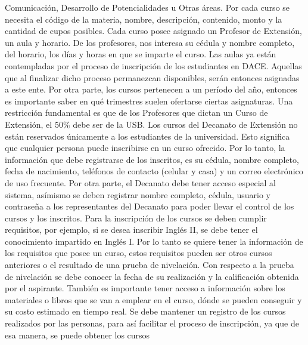 \message{ !name(InformeFase2.tex)}\documentclass[12pt,a4paper,spanish]{article}
\begin{document}
Comunicaci\'on, Desarrollo de Potencialidades u Otras \'areas. Por
cada curso se necesita el c\'odigo de la materia, nombre,
descripci\'on, contenido, monto y la cantidad de cupos posibles. Cada
curso posee asignado un Profesor de Extensi\'on, un aula y horario. De los
profesores, nos interesa su c\'edula y nombre completo, del horario,
los d\'ias y horas en que se imparte el curso. Las aulas ya est\'an
contempladas por el proceso de inscripci\'on de los estudiantes en
DACE. Aquellas que al finalizar dicho proceso permanezcan disponibles,
ser\'an entonces asignadas a este ente. Por otra parte, los cursos
pertenecen a un per\'iodo del a\~no, entonces es importante saber en
qu\'e trimestres suelen ofertarse ciertas asignaturas. Una
restricci\'on fundamental es que de los Profesores que dictan un Curso
de Extensi\'on, el 50\% debe ser de la USB.
\newline
\newline
\indent Los cursos del Decanato de Extensi\'on no est\'an reservados
\'unicamente a los estudiantes de la universidad. Esto significa que
cualquier persona puede inscribirse en un curso ofrecido. Por lo tanto, 
la informaci\'on que debe registrarse de los inscritos, es su
c\'edula, nombre completo, fecha de nacimiento, tel\'efonos de
contacto (celular y casa) y un correo electr\'onico de uso
frecuente. Por otra parte, el Decanato debe tener acceso especial
al sistema, as\'imismo se deben registrar nombre completo, c\'edula, 
usuario y contrase\~na a los representantes del Decanato para poder llevar 
el control de los cursos y los inscritos.
\newline
\newline
\indent Para la inscripci\'on de los cursos se deben cumplir
requisitos, por ejemplo, si se desea inscribir Ingl\'es II, se debe
tener el conocimiento impartido en Ingl\'es I. Por lo tanto se quiere 
tener la informaci\'on de los requisitos que posee un curso, estos
requisitos pueden ser otros cursos anteriores o el resultado de una
prueba de nivelaci\'on. Con respecto a la prueba de nivelaci\'on se debe conocer la fecha
de su realizaci\'on y la calificaci\'on obtenida por el aspirante. Tambi\'en es importante
tener acceso a informaci\'on sobre los materiales o libros que se van a emplear en el curso,
d\'onde se pueden conseguir y su costo estimado en tiempo real. 
\newline
\newline
\indent Se debe mantener un registro de los cursos
realizados por las personas, para as\'i facilitar el proceso de
inscripci\'on, ya que de esa manera, se puede obtener los cursos
\end{document}
